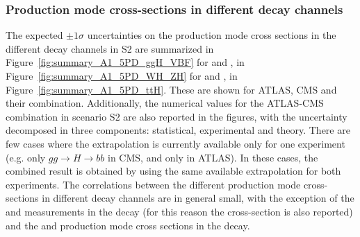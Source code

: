 


\subsubsection{Production mode cross-sections in different decay channels}
\label{sec:expcomb_prodtimesdecay}
The expected $\pm 1\sigma$ uncertainties on the production mode cross sections in the different decay channels in S2 are summarized in Figure~\ref{fig:summary_A1_5PD_ggH_VBF} for \ggh and \vbf, in Figure~\ref{fig:summary_A1_5PD_WH_ZH} for \wh and \zh, in Figure~\ref{fig:summary_A1_5PD_ttH}. These are shown for ATLAS, CMS and their combination. Additionally, the numerical values for the ATLAS-CMS combination in scenario S2 are also reported in the figures, with the uncertainty decomposed in three components: statistical, experimental and theory.
There are few cases where the extrapolation is currently available only for one experiment (e.g. only $gg \rightarrow H \rightarrow bb$ in CMS, and only \hzg in ATLAS). In these cases, the combined result is obtained by using the same available extrapolation  for both experiments.
The correlations between the different production mode cross-sections in different decay channels are in general small, with the exception of the \zh and \wh measurements in the \hzz decay (for this reason the \vh cross-section is also reported) and the \ggh and \vbf production mode cross sections in the \hmm decay. 


